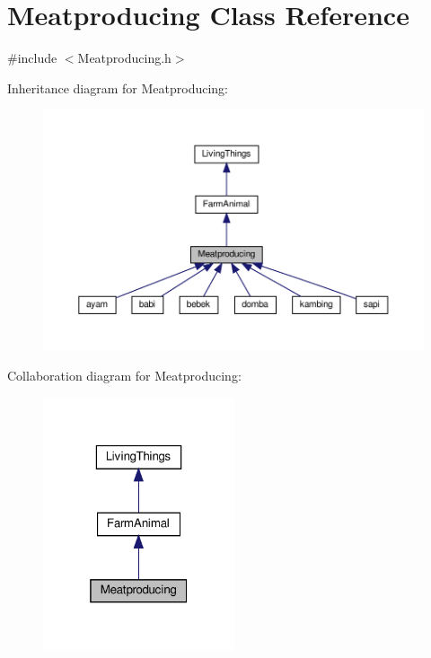 \hypertarget{classMeatproducing}{}\section{Meatproducing Class Reference}
\label{classMeatproducing}


{\ttfamily \#include $<$Meatproducing.\+h$>$}



Inheritance diagram for Meatproducing\+:
\nopagebreak
\begin{figure}[H]
\begin{center}
\leavevmode
\includegraphics[width=350pt]{classMeatproducing__inherit__graph}
\end{center}
\end{figure}


Collaboration diagram for Meatproducing\+:
\nopagebreak
\begin{figure}[H]
\begin{center}
\leavevmode
\includegraphics[width=160pt]{classMeatproducing__coll__graph}
\end{center}
\end{figure}
